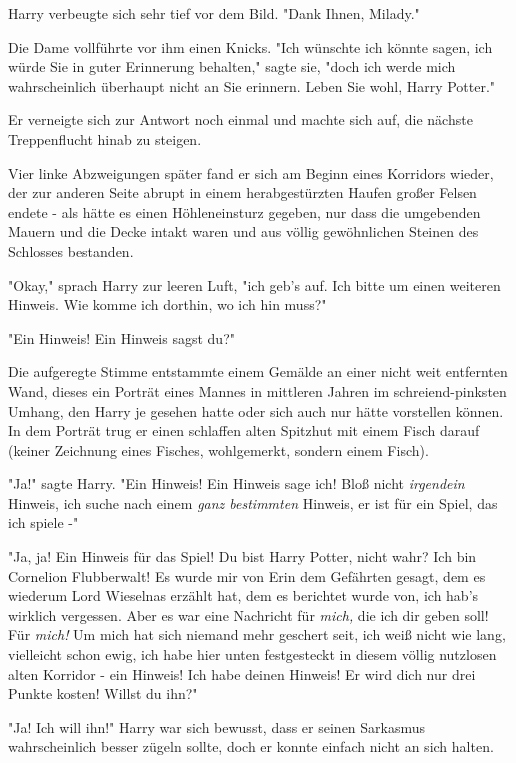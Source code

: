 {Harry verbeugte sich sehr tief vor dem Bild. "Dank Ihnen, Milady."

Die Dame vollführte vor ihm einen Knicks. "Ich wünschte ich könnte sagen, ich würde Sie in guter Erinnerung behalten," sagte sie, "doch ich werde mich wahrscheinlich überhaupt nicht an Sie erinnern. Leben Sie wohl, Harry Potter."

Er verneigte sich zur Antwort noch einmal und machte sich auf, die nächste Treppenflucht hinab zu steigen.

Vier linke Abzweigungen später fand er sich am Beginn eines Korridors wieder, der zur anderen Seite abrupt in einem herabgestürzten Haufen großer Felsen endete - als hätte es einen Höhleneinsturz gegeben, nur dass die umgebenden Mauern und die Decke intakt waren und aus völlig gewöhnlichen Steinen des Schlosses bestanden.

"Okay," sprach Harry zur leeren Luft, "ich geb's auf. Ich bitte um einen weiteren Hinweis. Wie komme ich dorthin, wo ich hin muss?"

"Ein Hinweis! Ein Hinweis sagst du?"

Die aufgeregte Stimme entstammte einem Gemälde an einer nicht weit entfernten Wand, dieses ein Porträt eines Mannes in mittleren Jahren im schreiend-pinksten Umhang, den Harry je gesehen hatte oder sich auch nur hätte vorstellen können. In dem Porträt trug er einen schlaffen alten Spitzhut mit einem Fisch darauf (keiner Zeichnung eines Fisches, wohlgemerkt, sondern einem Fisch).

"Ja!" sagte Harry. "Ein Hinweis! Ein Hinweis sage ich! Bloß nicht \emph{irgendein} Hinweis, ich suche nach einem \emph{ganz bestimmten} Hinweis, er ist für ein Spiel, das ich spiele -"

"Ja, ja! Ein Hinweis für das Spiel! Du bist Harry Potter, nicht wahr? Ich bin Cornelion Flubberwalt! Es wurde mir von Erin dem Gefährten gesagt, dem es wiederum Lord Wieselnas erzählt hat, dem es berichtet wurde von, ich hab's wirklich vergessen. Aber es war eine Nachricht für \emph{mich,} die ich dir geben soll! Für \emph{mich!} Um mich hat sich niemand mehr geschert seit, ich weiß nicht wie lang, vielleicht schon ewig, ich habe hier unten festgesteckt in diesem völlig nutzlosen alten Korridor - ein Hinweis! Ich habe deinen Hinweis! Er wird dich nur drei Punkte kosten! Willst du ihn?"

"Ja! Ich will ihn!" Harry war sich bewusst, dass er seinen Sarkasmus wahrscheinlich besser zügeln sollte, doch er konnte einfach nicht an sich halten.

}
